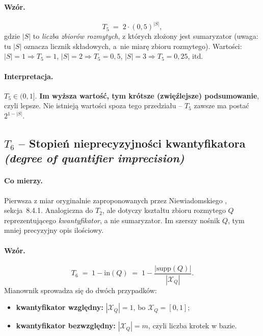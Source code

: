 \paragraph{Wzór.}
\begin{equation}
\label{eq:T5}
    T_5 \;=\; 2 \cdot (0{,}5)^{|S|},
\end{equation}
gdzie $|S|$ to \emph{liczba zbiorów rozmytych}, z których złożony jest
sumaryzator (uwaga: tu $|S|$ oznacza licznik składowych, a~nie miarę
zbioru rozmytego). Wartości:
$|S|=1 \Rightarrow T_5=1$,\;
$|S|=2 \Rightarrow T_5=0{,}5$,\;
$|S|=3 \Rightarrow T_5=0{,}25$, itd.

\paragraph{Interpretacja.}
$T_5 \in (0, 1]$. \textbf{Im wyższa wartość, tym krótsze (zwięźlejsze)
podsumowanie}, czyli lepsze. Nie istnieją wartości spoza tego
przedziału -- $T_5$ zawsze ma postać $2^{1-|S|}$.

\subsection*{$T_6$ -- Stopień nieprecyzyjności kwantyfikatora \\
\textit{(degree of quantifier imprecision)}}

\paragraph{Co mierzy.}
Pierwsza z miar oryginalnie zaproponowanych przez Niewiadomskiego
\cite{niewiadomski2008}, sekcja~8.4.1. Analogiczna do $T_2$, ale
dotyczy kształtu zbioru rozmytego $Q$ reprezentującego \emph{kwantyfikator},
a nie sumaryzator. Im szerszy nośnik $Q$, tym mniej precyzyjny opis
ilościowy.

\paragraph{Wzór.}
\begin{equation}
\label{eq:T6}
    T_6 \;=\; 1 - \mathrm{in}(Q) \;=\; 1 - \frac{|\mathrm{supp}(Q)|}{|\mathcal{X}_Q|}.
\end{equation}
Mianownik sprowadza się do dwóch przypadków:
\begin{itemize}
    \item \textbf{kwantyfikator względny:} $|\mathcal{X}_Q| = 1$,
    bo $\mathcal{X}_Q = [0, 1]$;
    \item \textbf{kwantyfikator bezwzględny:} $|\mathcal{X}_Q| = m$,
    czyli liczba krotek w bazie.
\end{itemize}

